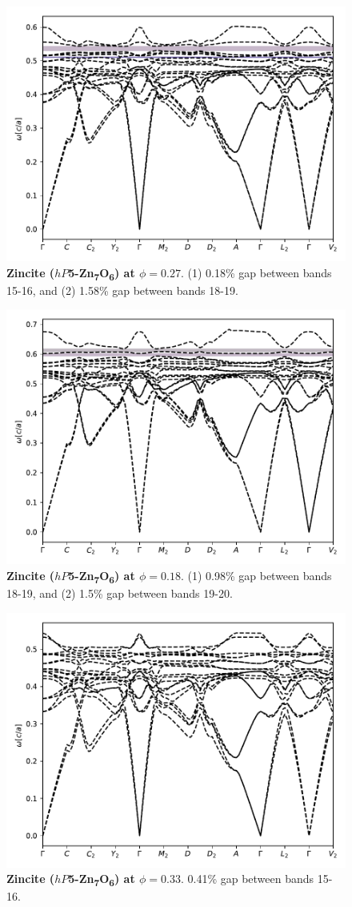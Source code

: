 \documentclass[fleqn,amsmath,amssymb,superscriptaddress, reprint,prl]{revtex4-1}
\begin{document}
\begin{figure}
\includegraphics[width=0.9\linewidth]{workspace/09091e2a1eaa4ecc224281fc26e0c08c/images/r=26.pdf}
	\caption{\textbf{Zincite ($hP$5-Zn\textsubscript{7}O\textsubscript{6}) at $\phi=0.27$}. (1) 0.18\% gap between bands 15-16, and (2) 1.58\% gap between bands 18-19.}
\end{figure}

\begin{figure}
\includegraphics[width=0.9\linewidth]{workspace/09091e2a1eaa4ecc224281fc26e0c08c/images/r=23.pdf}
	\caption{\textbf{Zincite ($hP$5-Zn\textsubscript{7}O\textsubscript{6}) at $\phi=0.18$}. (1) 0.98\% gap between bands 18-19, and (2) 1.5\% gap between bands 19-20.}
\end{figure}

\begin{figure}
\includegraphics[width=0.9\linewidth]{workspace/09091e2a1eaa4ecc224281fc26e0c08c/images/r=28.pdf}
	\caption{\textbf{Zincite ($hP$5-Zn\textsubscript{7}O\textsubscript{6}) at $\phi=0.33$}. 0.41\% gap between bands 15-16.}
\end{figure}
\end{document}
